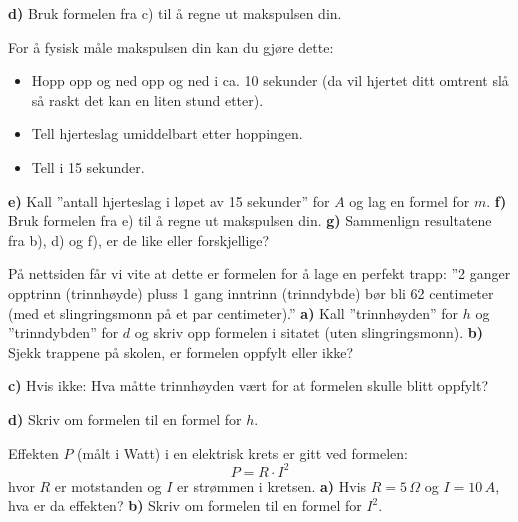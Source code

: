 \textbf{d)} Bruk formelen fra c) til å regne ut makspulsen din.

\vsk
For å fysisk måle makspulsen din kan du gjøre dette:
\begin{itemize}
	\item Hopp opp og ned opp og ned i ca. 10 sekunder (da vil hjertet ditt omtrent slå så raskt det kan en liten stund etter).
	\item Tell hjerteslag umiddelbart etter hoppingen.
	\item Tell i 15 sekunder.
\end{itemize}
\textbf{e)} Kall ''antall hjerteslag i løpet av 15 sekunder'' for $ A $ og lag en formel for $ m $.\os
\textbf{f)} Bruk formelen fra e) til å regne ut makspulsen din.\os
\textbf{g)} Sammenlign resultatene fra b), d) og f), er de like eller forskjellige?

\nes
{}
På nettsiden  får vi vite at dette er formelen for å lage en perfekt trapp:\os
''2 ganger opptrinn (trinnhøyde) pluss 1 gang inntrinn (trinndybde) bør bli 62 centimeter (med et slingringsmonn på et par centimeter).'' \os
\textbf{a)} Kall ''trinnhøyden'' for $ h $ og ''trinndybden'' for $ d $ og skriv opp formelen i sitatet (uten slingringsmonn).\os
\textbf{b)} Sjekk trappene på skolen, er formelen oppfylt eller ikke?\os

\textbf{c)} Hvis ikke: Hva måtte trinnhøyden vært for at formelen skulle blitt oppfylt?\os

\textbf{d)} Skriv om formelen til en formel for $ h $.

\begin{comment}
\op{frm4}
Formelen for BMI (Body Mass Index) ser slik ut:
\[ \text{BMI}=\frac{m}{h^2} \]
hvor $ m $ betyr en persons vekt (i kg) og $ h $ er personens høyde (i meter).\os

\textbf{a)} Hvis en person har $ {\text{BMI}=29} $ og er 2\,m høy, hvor mye veier da personen?\os
\textbf{b)} Hvis en person har $ {\text{BMI}=23} $ og veier 75\,kg, hvor høy er personen?\os
{\small 
\obs BMI er et mål som er lagd for å studere relasjonen mellom vekt og høyde \textsl{for store folkegrupper}. Det kan være interessant å vite hva BMI-en til 1000 mennesker er, men BMI-en til enkeltmennesker sier svært lite om personen. For eksempel blir både Aksel Lund Svindal og Ragnhild Mowinckel, to av Norges best trente atleter, definert som overvektige på BMI-skalaen.
\begin{center}
\texttt{[image: aksel]}
\texttt{[image: rag]}
\end{center}
Vi har brukt BMI-en til enkeltpersoner i oppgaven fordi det gir oss øving i formelregning.}
\end{comment}
Effekten $ P $ (målt i Watt) i en elektrisk krets er gitt ved formelen:
\[ P=R\cdot I^2 \]
hvor $ R $ er motstanden og $ I $ er strømmen i kretsen.\os
\textbf{a)} Hvis $ {R=5\,\Omega} $ og $ {I=10\,A} $, hva er da effekten?\os
\textbf{b)} Skriv om formelen til en formel for $ I^2 $.

